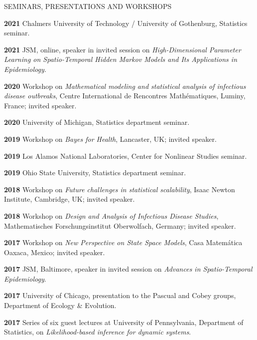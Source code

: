 \begin{mylist}{SEMINARS, PRESENTATIONS AND WORKSHOPS}
\item{\bf 2021} Chalmers University of Technology / University of Gothenburg, Statistics seminar.
                 
\item{\bf 2021} JSM, online, speaker in invited session on {\it High-Dimensional Parameter Learning on Spatio-Temporal Hidden Markov Models and Its Applications in Epidemiology.}
                 
\item{\bf 2020 } Workshop on {\it Mathematical modeling and statistical analysis of infectious disease outbreaks}, Centre International de Rencontres Math\'{e}matiques, Luminy, France; invited speaker.

\item{\bf 2020 } University of Michigan, Statistics department seminar.

\item{\bf 2019 } Workshop on {\it Bayes for Health}, Lancaster, UK; invited speaker.

  \item{\bf 2019 } Los Alamos National Laboratories, Center for Nonlinear Studies seminar.
  
  \item{\bf 2019 } Ohio State University, Statistics department seminar.
  
\item{\bf 2018 } Workshop on {\it Future challenges in statistical scalability}, Isaac Newton Institute, Cambridge, UK; invited speaker.

\item{\bf 2018 }  Workshop on {\it Design and Analysis of Infectious Disease Studies}, Mathematisches Forschungsinstitut Oberwolfach, Germany; invited speaker.

\item{\bf 2017 } Workshop on {\it New Perspective on State Space Models}, Casa Matem\'{a}tica Oaxaca, Mexico; invited speaker.

\item{\bf 2017 } JSM, Baltimore, speaker in invited session on {\it Advances in Spatio-Temporal Epidemiology}.

\item{\bf 2017 } University of Chicago, presentation to the Pascual and Cobey groups, Department of Ecology \& Evolution.

\item{\bf 2017 } Series of six guest lectures at University of Pennsylvania, Department of Statistics, on {\it Likelihood-based inference for dynamic systems}.


\end{mylist}
